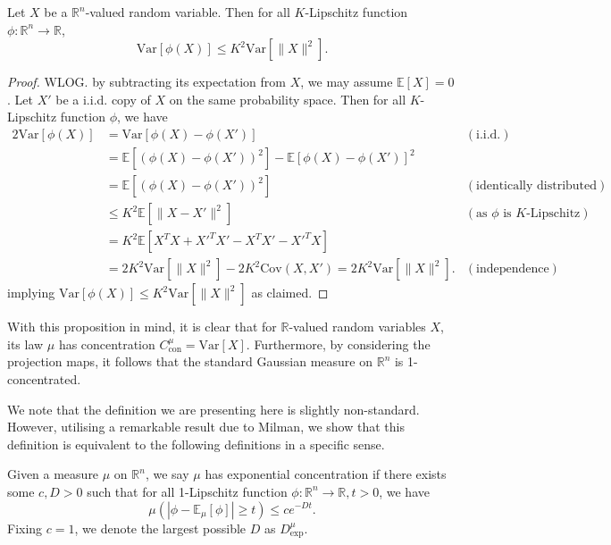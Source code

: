 \begin{proposition}\label{prop:concentration}
  Let \(X\) be a \(\mathbb{R}^n\)-valued random variable. Then for all \(K\)-Lipschitz function 
  \(\phi : \mathbb{R}^n \to \mathbb{R}\),
  \[\text{Var}[\phi(X)] \le K^2 \text{Var}[\|X\|^2].\]
\end{proposition}
\begin{proof}
  WLOG. by subtracting its expectation from \(X\), we may assume \(\mathbb{E}[X] = 0\).
  Let \(X'\) be a i.i.d. copy of \(X\) on the same probability space. Then for all \(K\)-Lipschitz 
  function \(\phi\), we have 
  \begin{align*}
    2 \text{Var}[\phi(X)] & = \text{Var}[\phi(X) - \phi(X')] & (\text{i.i.d.})\\
      & = \mathbb{E}[(\phi(X) - \phi(X'))^2] - \mathbb{E}[\phi(X) - \phi(X')]^2 & \\
      & = \mathbb{E}[(\phi(X) - \phi(X'))^2] & (\text{identically distributed}) \\
      & \le K^2 \mathbb{E}[\|X - X'\|^2] & (\text{as \(\phi\) is \(K\)-Lipschitz}) \\
      & = K^2 \mathbb{E}[X^T X + X'^T X' - X^T X' - X'^T X] & \\
      & = 2K^2 \text{Var}[\|X\|^2] - 2K^2 \text{Cov}(X, X') = 2K^2 \text{Var}[\|X\|^2]. & (\text{independence})
  \end{align*}
  implying \(\text{Var}[\phi(X)] \le K^2 \text{Var}[\|X\|^2]\) as claimed.
\end{proof}

With this proposition in mind, it is clear that for \(\mathbb{R}\)-valued random variables \(X\), 
its law \(\mu\) has concentration \(C^\mu_{\text{con}} = \text{Var}[X]\). Furthermore, by 
considering the projection maps, it follows that the standard Gaussian measure on \(\mathbb{R}^n\) 
is 1-concentrated.

We note that the definition we are presenting here is slightly non-standard. However, utilising a 
remarkable result due to Milman, we show that this definition is equivalent to the following 
definitions in a specific sense.

\begin{definition}
  Given a measure \(\mu\) on \(\mathbb{R}^n\), we say \(\mu\) has exponential concentration if 
  there exists some \(c, D > 0\) such that for all 1-Lipschitz function 
  \(\phi : \mathbb{R}^n \to \mathbb{R}, t > 0\), we have
  \begin{equation}
    \mu(|\phi - \mathbb{E}_\mu[\phi]| \ge t) \le c e^{-Dt}.
  \end{equation}
  Fixing \(c = 1\), we denote the largest possible \(D\) as \(D^\mu_{\text{exp}}\).
\end{definition}

